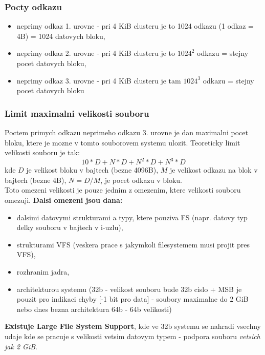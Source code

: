\documentclass[a4paper, 11pt]{article}
\begin{document}
\newpage

\subsubsection{Pocty odkazu}
\begin{itemize}
    \item neprimy odkaz 1. urovne - pri 4 KiB clusteru je to 1024 odkazu (1 odkaz = 4B) = 1024 datovych bloku,
    \item neprimy odkaz 2. urovne - pri 4 KiB clusteru je to $1024^2$ odkazu = stejny pocet datovych bloku,
    \item neprimy odkaz 3. urovne - pri 4 KiB clusteru je tam $1024^3$ odkazu = stejny pocet datovych bloku \\
\end{itemize}

\subsubsection{Limit maximalni velikosti souboru}

Poctem primych odkazu neprimeho odkazu 3. urovne je dan maximalni pocet bloku, ktere je mozne v tomto souborovem systemu ulozit. Teoreticky limit velikosti souboru je tak:
$$10 * D + N * D + N^2 * D + N^3 * D$$
kde $D$ je velikost bloku v bajtech (bezne 4096B), $M$ je velikost odkazu na blok v bajtech (bezne 4B), $N = D/M$, je pocet odkazu v bloku. \\

Toto omezeni velikosti je pouze jednim z omezenim, ktere velikosti souboru omezuji. \textbf{Dalsi omezeni jsou dana:}
\begin{itemize}
    \item dalsimi datovymi strukturami a typy, ktere pouziva FS (napr. datovy typ delky souboru v bajtech v i-uzlu),  
    \item strukturami VFS (veskera prace s jakymkoli filesystemem musi projit pres VFS),
    \item rozhranim jadra,
    \item architekturou systemu (32b - velikost souboru bude 32b cislo + MSB je pouzit pro indikaci chyby [-1 bit pro data] - soubory maximalne do 2 GiB nebo dnes bezna architektura 64b - 64b velikosti) \\
\end{itemize}

\textbf{Existuje Large File System Support}, kde ve 32b systemu se nahradi vsechny udaje kde se pracuje s velikosti vetsim datovym typem - podpora souboru \textit{vetsich jak 2 GiB}. \\
\end{document}
